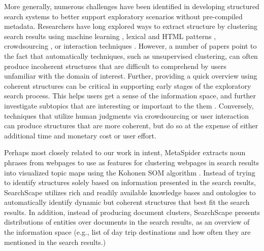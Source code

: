 More generally, numerous challenges have been identified \cite{teevan2008challenges} in developing structured search systems to better support exploratory scenarios without pre-compiled metadata. Researchers have long explored ways to extract structure by clustering search results using machine learning \cite{zamir1999grouper,zeng2004learning,hearst1996reexamining}, lexical and HTML patterns \cite{kong2014extending}, crowdsourcing \cite{ka,alloy,cascade}, or interaction techniques \cite{hearst1996reexamining,hearst1996visualizing,hearst1996visualizing}. However, a number of papers \cite{hearst2006clustering,chuang2012interpretation,alloy} point to the fact that automatically techniques, such as unsupervised clustering, can often produce incoherent structures that are difficult to comprehend by users unfamiliar with the domain of interest. Further, providing a quick overview using coherent structures can be critical in supporting early stages of the exploratory search process. This helps users get a sense of the information space, and further investigate subtopics that are interesting or important to the them \cite{mar2006exp}. Conversely, techniques that utilize human judgments via crowdsourcing or user interaction can produce structures that are more coherent, but do so at the expense of either additional time and monetary cost or user effort\cite{alloy,ka}.

Perhaps most closely related to our work in intent, MetaSpider extracts noun phrases from webpages to use as features for clustering webpages in search results into visualized topic maps using the Kohonen SOM algorithm \cite{chen2001metaspider,kohonen1998self}.
Instead of trying to identify structures solely based on information presented in the search results, SearchScape utilizes rich and readily available knowledge bases and ontologies to automatically identify dynamic but coherent structures that best fit the search results.
In addition, instead of producing document clusters, SearchScape presents distributions of entities over documents in the search results, as an overview of the information space (e.g., list of day trip destinations and how often they are mentioned in the search results.)








